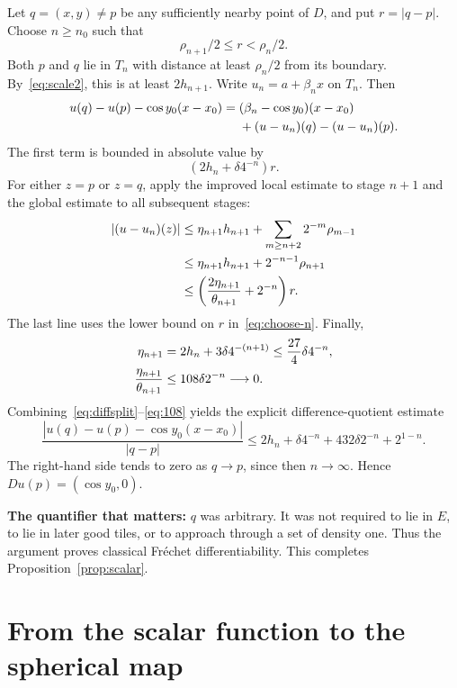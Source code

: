 \documentclass[11pt,letterpaper]{article}
\numberwithin{equation}{section}
\theoremstyle{remark}
\begin{document}
Let $q=(x,y)\ne p$ be any sufficiently nearby point of $D$, and put $r=|q-p|$. Choose $n\ge n_0$ such that
\begin{equation}\label{eq:choose-n}
 \rho_{n+1}/2\le r<\rho_n/2.
\end{equation}
Both $p$ and $q$ lie in $T_n$ with distance at least $\rho_n/2$ from its boundary. By~\eqref{eq:scale2}, this is at least $2h_{n+1}$. Write $u_n=a+\beta_nx$ on $T_n$. Then
\begin{align}
 u(q)-u(p)-\cos y_0(x-x_0)
 ={}&(\beta_n-\cos y_0)(x-x_0)\notag\\
 &+(u-u_n)(q)-(u-u_n)(p).\label{eq:diffsplit}
\end{align}
The first term is bounded in absolute value by
\[
 (2h_n+\delta4^{-n})r.
\]
For either $z=p$ or $z=q$, apply the improved local estimate to stage $n+1$ and the global estimate to all subsequent stages:
\begin{align}
 |(u-u_n)(z)|
 &\le\eta_{n+1}h_{n+1}
   +\sum_{m\ge n+2}2^{-m}\rho_{m-1}\notag\\
 &\le\eta_{n+1}h_{n+1}
   +2^{-n-1}\rho_{n+1}\notag\\
 &\le\left(\frac{2\eta_{n+1}}{\theta_{n+1}}+2^{-n}\right)r.
 \label{eq:tail}
\end{align}
The last line uses the lower bound on $r$ in~\eqref{eq:choose-n}. Finally,
\begin{align}
 \eta_{n+1}
 &=2h_n+3\delta4^{-(n+1)}
 \le\frac{27}{4}\delta4^{-n},\notag\\
 \frac{\eta_{n+1}}{\theta_{n+1}}
 &\le108\delta2^{-n}\longrightarrow0.\label{eq:108}
\end{align}
Combining~\eqref{eq:diffsplit}--\eqref{eq:108} yields the explicit difference-quotient estimate
\begin{equation}\label{eq:finaldiff}
 \frac{|u(q)-u(p)-\cos y_0(x-x_0)|}{|q-p|}
 \le2h_n+\delta4^{-n}+432\delta2^{-n}+2^{1-n}.
\end{equation}
The right-hand side tends to zero as $q\to p$, since then $n\to\infty$. Hence $Du(p)=(\cos y_0,0)$.

\textbf{The quantifier that matters:} $q$ was arbitrary. It was not required to lie in $E$, to lie in later good tiles, or to approach through a set of density one. Thus the argument proves classical Fr\'echet differentiability. This completes Proposition~\ref{prop:scalar}.

\section{From the scalar function to the spherical map}
\label{sec:geometry}
\end{document}
